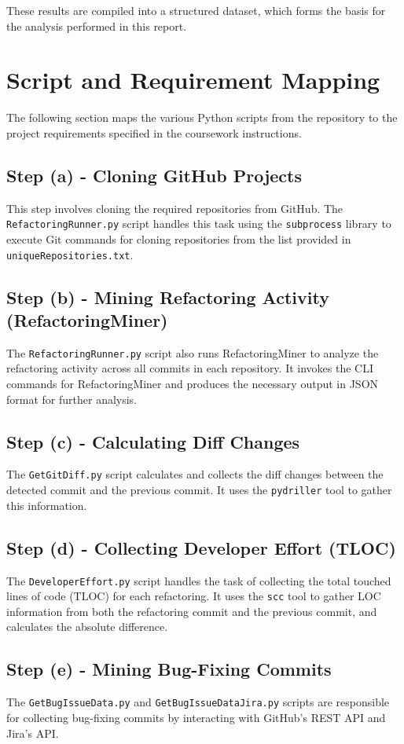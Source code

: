 \documentclass[sigconf]{acmart}
\begin{document}
These results are compiled into a structured dataset, which forms the basis for the analysis performed in this report.


\section{Script and Requirement Mapping}
The following section maps the various Python scripts from the repository to the project requirements specified in the coursework instructions.

\subsection{Step (a) - Cloning GitHub Projects}
This step involves cloning the required repositories from GitHub. The \texttt{RefactoringRunner.py} script handles this task using the \texttt{subprocess} library to execute Git commands for cloning repositories from the list provided in \texttt{uniqueRepositories.txt}.

\subsection{Step (b) - Mining Refactoring Activity (RefactoringMiner)}
The \texttt{RefactoringRunner.py} script also runs RefactoringMiner to analyze the refactoring activity across all commits in each repository. It invokes the CLI commands for RefactoringMiner and produces the necessary output in JSON format for further analysis.

\subsection{Step (c) - Calculating Diff Changes}
The \texttt{GetGitDiff.py} script calculates and collects the diff changes between the detected commit and the previous commit. It uses the \texttt{pydriller} tool to gather this information.

\subsection{Step (d) - Collecting Developer Effort (TLOC)}
The \texttt{DeveloperEffort.py} script handles the task of collecting the total touched lines of code (TLOC) for each refactoring. It uses the \texttt{scc} tool to gather LOC information from both the refactoring commit and the previous commit, and calculates the absolute difference.

\subsection{Step (e) - Mining Bug-Fixing Commits}
The \texttt{GetBugIssueData.py} and \texttt{GetBugIssueDataJira.py} scripts are responsible for collecting bug-fixing commits by interacting with GitHub's REST API and Jira's API.
\end{document}
